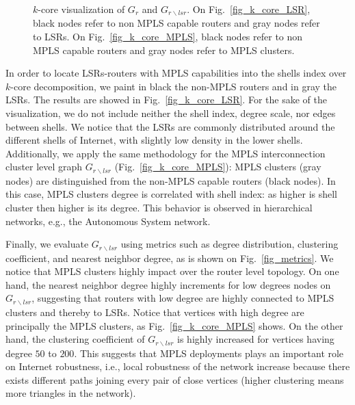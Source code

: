 \begin{figure*}[!t]
  \begin{center}
\hfil
  \end{center}
  \caption{$k$-core visualization of $G_r$ and $G_{r \backslash lsr}$.  On
  Fig.~\ref{fig_k_core_LSR}, black nodes refer to non MPLS capable routers and
  gray nodes refer to LSRs.  On Fig.~\ref{fig_k_core_MPLS}, black nodes refer to
  non MPLS capable routers and gray nodes refer to MPLS clusters.} 
  \label{fig_kcore_overview}
\end{figure*}

In order to locate LSRs-routers with MPLS capabilities into the shells index
over $k$-core decomposition, we paint in black the non-MPLS routers and in gray
the LSRs. The results are showed in Fig.~\ref{fig_k_core_LSR}.  For the sake of
the visualization, we do not include neither the shell index, degree scale, nor
edges between shells. 
We notice that the LSRs are commonly distributed around
the different shells of Internet, with slightly low density in the lower shells.   
Additionally, we apply the same methodology
for the MPLS interconnection cluster level graph $G_{r\backslash lsr}$
(Fig.~\ref{fig_k_core_MPLS}): MPLS clusters (gray nodes) are distinguished from
the non-MPLS capable routers (black nodes). 
In this case,  MPLS clusters  degree is correlated with shell index: as higher is shell cluster then higher is its degree. This behavior is observed in hierarchical networks, e.g., the Autonomous System network. 


Finally, we evaluate $G_{r \backslash lsr }$ using metrics such as degree distribution, clustering coefficient, and nearest
neighbor degree, as is shown on Fig.~\ref{fig_metrics}.
We notice that MPLS clusters highly impact over the router level topology. On
one hand, the nearest neighbor degree highly increments for low degrees nodes on
$G_{r \backslash lsr}$, suggesting that routers with low degree are highly
connected to MPLS clusters and thereby to LSRs. Notice that vertices with high degree are principally the MPLS clusters, as Fig.~\ref{fig_k_core_MPLS} shows.
On the other hand, the clustering coefficient of $G_{r \backslash lsr }$ is highly increased for vertices having degree $50$ to $200$. This suggests that MPLS deployments plays an important role on Internet robustness, i.e., local robustness of the network increase because there exists different paths joining every pair of close vertices (higher clustering means more triangles in the network).

